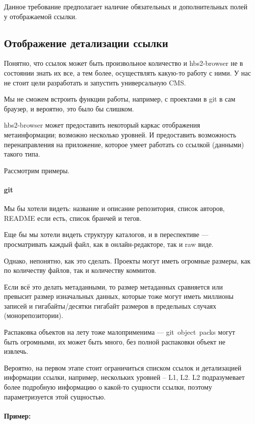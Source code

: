 Данное требование предполагает наличие обязательных и дополнительных
полей у отображаемой ссылки.


\subsection{Отображение детализации ссылки}

Понятно, что ссылок может быть произвольное количество и hbs2-browser
не в состоянии знать их все, а тем более, осуществлять какую-то работу
с ними. У нас не стоит цели разработать и запустить универсальную CMS.

Мы не сможем встроить функции работы, например, с проектами в git в
сам браузер, и вероятно, это было бы слишком.

hbs2-browser может предоставить некоторый каркас отображения
метаинформации; возможно несколько уровней. И предоставить возможность
перенаправления на приложение, которое умеет работать со ссылкой
(данными) такого типа.

Рассмотрим примеры.

\paragraph{git} Мы бы хотели видеть: название и описание репозитория,
список авторов, README если есть, список бранчей и тегов.

Еще бы мы хотели видеть структуру каталогов, и в переспективе ---
просматривать каждый файл, как в онлайн-редакторе, так и raw виде.

Однако, непонятно, как это сделать. Проекты могут иметь огромные
размеры, как по количеству файлов, так и количеству коммитов.

Если всё это делать метаданными, то размер метаданных сравняется
или превысит размер изначальных данных, которые тоже могут
иметь миллионы записей и гигабайты/десятки гигабайт размеров
в предельных случаях (монорепозитории).

Распаковка объектов на лету тоже малоприменима --- git~object~packs
могут быть огромными, их может быть много, без полной распаковки
объект не извлечь.

Вероятно, на первом этапе стоит ограничиться списком ссылок и
детализацией информации ссылки, например, нескольких уровней -- L1,
L2. L2 подразумевает более подробную информацию о какой-то сущности
ссылки, поэтому параметризуется этой сущностью.

\paragraph{Пример:}

